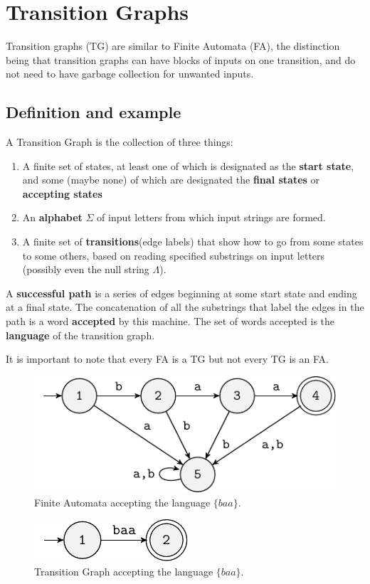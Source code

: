 \section{Transition Graphs}

Transition graphs (TG) are similar to Finite Automata (FA), the distinction being that transition graphs can have blocks of inputs on one transition, and do not need to have garbage collection for unwanted inputs.

\subsection{Definition and example}
A Transition Graph is the collection of three things:
\begin{enumerate}
    \item A finite set of states, at least one of which is designated as the \textbf{start state}, and some (maybe none) of which are designated the \textbf{final states} or \textbf{accepting states}
    \item An \textbf{alphabet} \(\Sigma\) of input letters from which input strings are formed.
    \item A finite set of \textbf{transitions}(edge labels) that show how to go from some states to some others, based on reading specified substrings on input letters (possibly even the null string \(\Lambda\)).
\end{enumerate}
A \textbf{successful path} is a series of edges beginning at some start state and ending at a final state.
The concatenation of all the substrings that label the edges in the path is a word \textbf{accepted} by this machine. The set of words accepted is the \textbf{language} of the transition graph.

It is important to note that every FA is a TG but not every TG is an FA.

\begin{figure}[h!]
    \centering
    \includegraphics[width=0.7\linewidth]{lectures/figures/6-fa.pdf}
    \caption{Finite Automata accepting the language \(\{baa\}\).}
\end{figure}
\begin{figure}[h!]
    \centering
    \includegraphics[width=0.33\linewidth]{lectures/figures/6-tg.pdf}
    \caption{Transition Graph accepting the language \(\{baa\}\).}
\end{figure}

